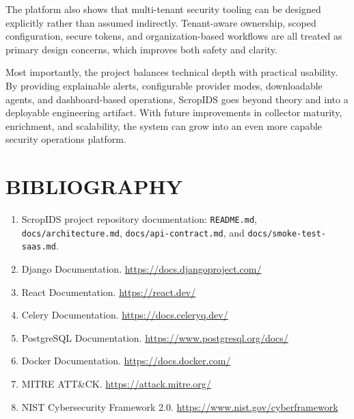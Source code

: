 \documentclass[12pt,a4paper]{article}
\begin{document}
The platform also shows that multi-tenant security tooling can be designed explicitly rather than assumed indirectly. Tenant-aware ownership, scoped configuration, secure tokens, and organization-based workflows are all treated as primary design concerns, which improves both safety and clarity.

Most importantly, the project balances technical depth with practical usability. By providing explainable alerts, configurable provider modes, downloadable agents, and dashboard-based operations, ScropIDS goes beyond theory and into a deployable engineering artifact. With future improvements in collector maturity, enrichment, and scalability, the system can grow into an even more capable security operations platform.

\clearpage
\section*{BIBLIOGRAPHY}
\begin{enumerate}
    \item ScropIDS project repository documentation: \texttt{README.md}, \texttt{docs/architecture.md}, \texttt{docs/api-contract.md}, and \texttt{docs/smoke-test-saas.md}.
    \item Django Documentation. \url{https://docs.djangoproject.com/}
    \item React Documentation. \url{https://react.dev/}
    \item Celery Documentation. \url{https://docs.celeryq.dev/}
    \item PostgreSQL Documentation. \url{https://www.postgresql.org/docs/}
    \item Docker Documentation. \url{https://docs.docker.com/}
    \item MITRE ATT\&CK. \url{https://attack.mitre.org/}
    \item NIST Cybersecurity Framework 2.0. \url{https://www.nist.gov/cyberframework}
\end{enumerate}
\end{document}
